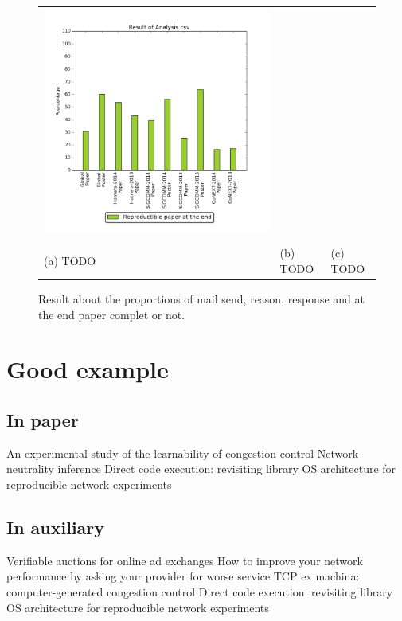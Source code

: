 \documentclass[a4paper]{SIGCOMM}
\begin{document}
\begin{figure}[!t]
\begin{tabular}{p{}p{}p{}}
    \href{http://nhoutain.github.io/Reproducibility/}
        {\includegraphics[width=0.7\columnwidth]{stat/bar_mail/bar_mail3-all.png}} \\

        & & \\

        (a) TODO & (b) TODO & (c) TODO \\
\end{tabular}

    \caption{Result about the proportions of mail send, reason, response and at the end paper complet or not.}
     \label{f:bar_mail}
\end{figure}




\section{Good example}

\subsection{In paper}
An experimental study of the learnability of congestion control
Network neutrality inference
Direct code execution: revisiting library OS architecture for reproducible network experiments

\subsection{In auxiliary}
Verifiable auctions for online ad exchanges
How to improve your network performance by asking your provider for worse service
TCP ex machina: computer-generated congestion control
Direct code execution: revisiting library OS architecture for reproducible network experiments
\end{document}
